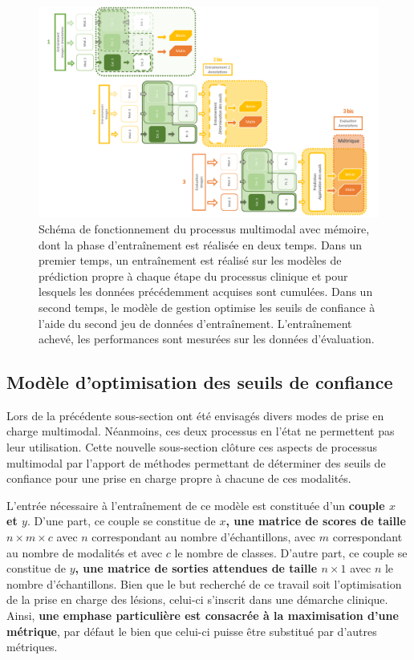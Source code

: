 \begin{landscape}
\begin{figure}[H]
    \centering
    \includegraphics[width=0.85\linewidth]{contents/chapter_8/resources/scheme_multimodal_process_with.pdf}
    \caption{Schéma de fonctionnement du processus multimodal avec mémoire, dont la phase d'entraînement est réalisée en deux temps. Dans un premier temps, un entraînement est réalisé sur les modèles de prédiction propre à chaque étape du processus clinique et pour lesquels les données précédemment acquises sont cumulées. Dans un second temps, le modèle de gestion optimise les seuils de confiance à l'aide du second jeu de données d'entraînement. L'entraînement achevé, les performances sont mesurées sur les données d'évaluation.}
    \label{fig:scheme_multimodal_process_with}
\end{figure}\par
\end{landscape}

\subsection{Modèle d'optimisation des seuils de confiance}
\label{sec:multimodal_confidence_model}
Lors de la précédente sous-section ont été envisagés divers modes de prise en charge multimodal. Néanmoins, ces deux processus en l'état ne permettent pas leur utilisation. Cette nouvelle sous-section clôture ces aspects de processus multimodal par l'apport de méthodes permettant de déterminer des seuils de confiance pour une prise en charge propre à chacune de ces modalités.\par

L'entrée nécessaire à l'entraînement de ce modèle est constituée d'un \textbf{couple $x$ et $y$}. D'une part, ce couple se constitue de \textbf{$x$, une matrice de scores de taille $n \times m \times c$} avec $n$ correspondant au nombre d'échantillons, avec $m$ correspondant au nombre de modalités et avec $c$ le nombre de classes. D'autre part, ce couple se constitue de \textbf{$y$, une matrice de sorties attendues de taille $n \times 1$} avec $n$ le nombre d'échantillons. Bien que le but recherché de ce travail soit l'optimisation de la prise en charge des lésions, celui-ci s'inscrit dans une démarche clinique. Ainsi, \textbf{une emphase particulière est consacrée à la maximisation d'une métrique}, par défaut le \fscore{} bien que celui-ci puisse être substitué par d'autres métriques.\par

